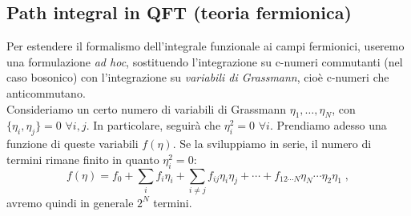 \documentclass[12pt,a4paper]{article}
\theoremstyle{definition}
\numberwithin{equation}{section}
\begin{document}
\subsection{Path integral in QFT (teoria fermionica)}
Per estendere il formalismo dell'integrale funzionale ai campi fermionici, useremo una formulazione \emph{ad hoc}, sostituendo l'integrazione su c-numeri commutanti (nel caso bosonico) con l'integrazione su \emph{variabili di Grassmann}, cioè c-numeri che anticommutano. \\
Consideriamo un certo numero di variabili di Grassmann $\eta_1,\ldots,\eta_N$, con $\{\eta_i,\eta_j\}=0$ $\forall i,j$. In particolare, seguirà che $\eta_i^2=0$ $\forall i$. Prendiamo adesso una funzione di queste variabili $f(\eta)$. Se la sviluppiamo in serie, il numero di termini rimane finito in quanto $\eta_i^2=0$:
\begin{equation}
f(\eta)=f_0+\sum_i f_i\eta_i+\sum_{i\ne j}f_{ij}\eta_i\eta_j+\cdots+f_{12\cdots N}\eta_N\cdots\eta_2\eta_1\;, \label{ch6_sviluppoberezin}
\end{equation}
avremo quindi in generale $2^N$ termini. \\
\end{document}
